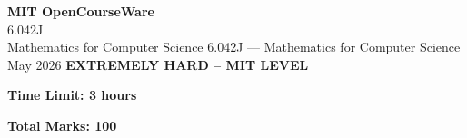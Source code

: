 \documentclass[12pt,a4paper]{exam}
\begin{document}
\begin{center}
{\LARGE \textbf{MIT OpenCourseWare}}\\6.042J\\Mathematics for Computer Science
\vspace{0.5cm}
{6.042J} --- {Mathematics for Computer Science}
\vspace{0.3cm}
May 2026
\vspace{0.3cm}
\textbf{EXTREMELY HARD -- MIT LEVEL}
\end{center}

\begin{center}
\textbf{Time Limit: 3 hours}
\end{center}

\begin{center}
\textbf{Total Marks: 100}
\end{center}

\vspace{0.5cm}
\end{document}

